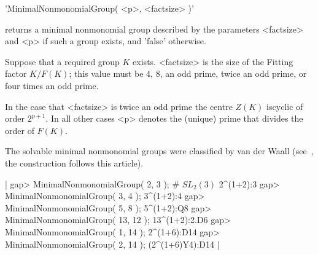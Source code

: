 
'MinimalNonmonomialGroup( <p>, <factsize> )'

returns a minimal nonmonomial group described by the parameters
<factsize> and <p> if such a group exists, and 'false' otherwise.

Suppose that a required group $K$ exists.
<factsize> is the size of the Fitting factor $K / F(K)$; this value must
be 4, 8, an odd prime, twice an odd prime, or four times an odd prime.

In the case that <factsize> is twice an odd prime the centre $Z(K)$ iscyclic
of order $2^{p+1}$.  In all other cases <p> denotes the (unique) prime that
divides the order of $F(K)$.

The solvable minimal nonmonomial groups were classified by van der Waall
(see~\cite{vdW76}, the construction follows this article).

|    gap> MinimalNonmonomialGroup(  2,  3 ); # $SL_2(3)$
    2^(1+2):3
    gap> MinimalNonmonomialGroup(  3,  4 );
    3^(1+2):4
    gap> MinimalNonmonomialGroup(  5,  8 );
    5^(1+2):Q8
    gap> MinimalNonmonomialGroup( 13, 12 );
    13^(1+2):2.D6
    gap> MinimalNonmonomialGroup(  1, 14 );
    2^(1+6):D14
    gap> MinimalNonmonomialGroup(  2, 14 );
    (2^(1+6)Y4):D14 |

